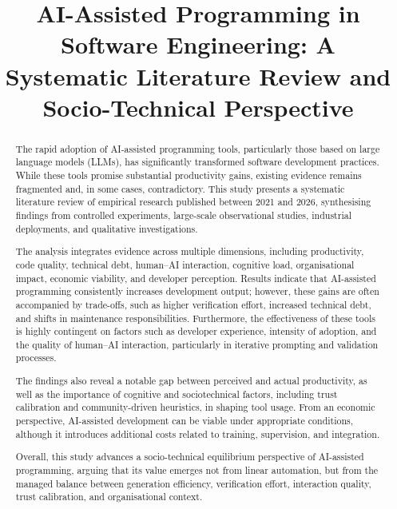 \documentclass[conference]{IEEEtran}
\begin{document}
\title{AI-Assisted Programming in Software Engineering: A Systematic Literature Review and Socio-Technical Perspective}

\author{
}

\maketitle

\begin{abstract}
The rapid adoption of AI-assisted programming tools, particularly those based on large language models (LLMs), has significantly transformed software development practices. While these tools promise substantial productivity gains, existing evidence remains fragmented and, in some cases, contradictory. This study presents a systematic literature review of empirical research published between 2021 and 2026, synthesising findings from controlled experiments, large-scale observational studies, industrial deployments, and qualitative investigations.

The analysis integrates evidence across multiple dimensions, including productivity, code quality, technical debt, human--AI interaction, cognitive load, organisational impact, economic viability, and developer perception. Results indicate that AI-assisted programming consistently increases development output; however, these gains are often accompanied by trade-offs, such as higher verification effort, increased technical debt, and shifts in maintenance responsibilities. Furthermore, the effectiveness of these tools is highly contingent on factors such as developer experience, intensity of adoption, and the quality of human--AI interaction, particularly in iterative prompting and validation processes.

The findings also reveal a notable gap between perceived and actual productivity, as well as the importance of cognitive and sociotechnical factors, including trust calibration and community-driven heuristics, in shaping tool usage. From an economic perspective, AI-assisted development can be viable under appropriate conditions, although it introduces additional costs related to training, supervision, and integration.

Overall, this study advances a socio-technical equilibrium perspective of AI-assisted programming, arguing that its value emerges not from linear automation, but from the managed balance between generation efficiency, verification effort, interaction quality, trust calibration, and organisational context.
\end{abstract}
\end{document}
